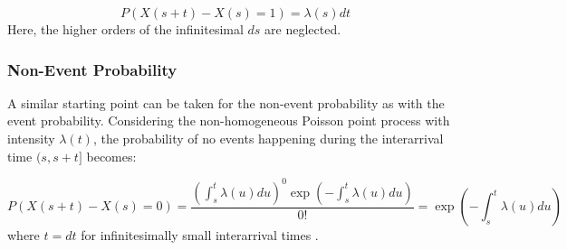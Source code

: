\begin{equation}
    P(X(s+t) - X(s) = 1) = \lambda(s) dt
\end{equation}
Here, the higher orders of the infinitesimal $ds$ are neglected.

\subsubsection{Non-Event Probability}
\label{sec:Method:Poisson:NonEventProbability}
A similar starting point can be taken for the non-event probability as with the event probability.
Considering the non-homogeneous Poisson point process with intensity $\lambda(t)$, the probability of no events happening during the interarrival time $(s, s+t]$ becomes:

\begin{equation}
    P(X(s+t) - X(s) = 0) 
    = 
    \frac{\left(\int_s^t \lambda(u)du \right)^0 \exp \left(- \int_s^t \lambda(u)du\right)}{0!}
    = 
    \exp \left(- \int_s^t \lambda(u)du\right)
\end{equation}
where $t = dt$ for infinitesimally small interarrival times \cite{Tommerup2021LearningNetworks}.
